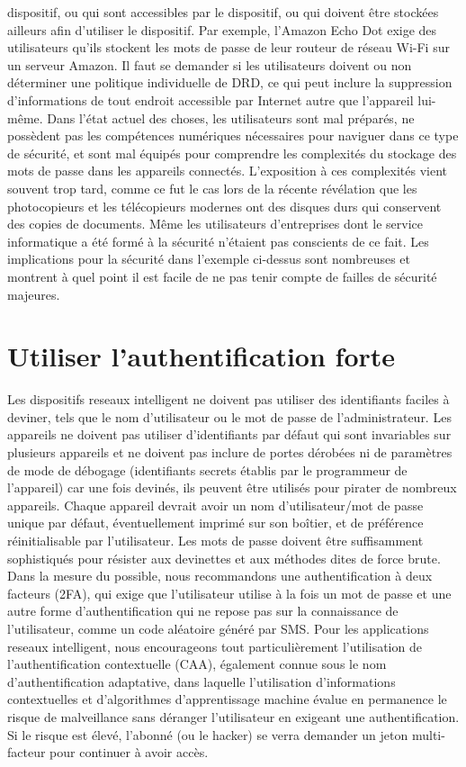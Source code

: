 \documentclass[12pt]{report}
\begin{document}
dispositif, ou qui sont accessibles par le dispositif, ou qui doivent
être stockées ailleurs afin d'utiliser le dispositif. Par exemple,
l'Amazon Echo Dot exige des utilisateurs qu'ils stockent les mots de
passe de leur routeur de réseau Wi-Fi sur un serveur Amazon. Il faut se
demander si les utilisateurs doivent ou non déterminer une politique
individuelle de DRD, ce qui peut inclure la suppression d'informations
de tout endroit accessible par Internet autre que l'appareil lui-même.
Dans l'état actuel des choses, les utilisateurs sont mal préparés, ne
possèdent pas les compétences numériques nécessaires pour naviguer dans
ce type de sécurité, et sont mal équipés pour comprendre les complexités
du stockage des mots de passe dans les appareils connectés. L'exposition
à ces complexités vient souvent trop tard, comme ce fut le cas lors de
la récente révélation que les photocopieurs et les télécopieurs modernes
ont des disques durs qui conservent des copies de documents. Même les
utilisateurs d'entreprises dont le service informatique a été formé à la
sécurité n'étaient pas conscients de ce fait. Les implications pour la
sécurité dans l'exemple ci-dessus sont nombreuses et montrent à quel
point il est facile de ne pas tenir compte de failles de sécurité
majeures.

\hypertarget{utiliser-lauthentification-forte}{%
      \section{\texorpdfstring{Utiliser l'authentification forte
        }{Utiliser l'authentification forte }}\label{utiliser-lauthentification-forte}}

Les dispositifs reseaux intelligent ne doivent pas utiliser des identifiants faciles à
deviner, tels que le nom d'utilisateur ou le mot de passe de
l'administrateur. Les appareils ne doivent pas utiliser d'identifiants
par défaut qui sont invariables sur plusieurs appareils et ne doivent
pas inclure de portes dérobées ni de paramètres de mode de débogage
(identifiants secrets établis par le programmeur de l'appareil) car une
fois devinés, ils peuvent être utilisés pour pirater de nombreux
appareils. Chaque appareil devrait avoir un nom d'utilisateur/mot de
passe unique par défaut, éventuellement imprimé sur son boîtier, et de
préférence réinitialisable par l'utilisateur. Les mots de passe doivent
être suffisamment sophistiqués pour résister aux devinettes et aux
méthodes dites de force brute. Dans la mesure du possible, nous
recommandons une authentification à deux facteurs (2FA), qui exige que
l'utilisateur utilise à la fois un mot de passe et une autre forme
d'authentification qui ne repose pas sur la connaissance de
l'utilisateur, comme un code aléatoire généré par SMS. Pour les
applications reseaux intelligent, nous encourageons tout particulièrement l'utilisation
de l'authentification contextuelle (CAA), également connue sous le nom
d'authentification adaptative, dans laquelle l'utilisation
d'informations contextuelles et d'algorithmes d'apprentissage machine
évalue en permanence le risque de malveillance sans déranger
l'utilisateur en exigeant une authentification. Si le risque est élevé,
l'abonné (ou le hacker) se verra demander un jeton multi-facteur pour
continuer à avoir accès.
\end{document}
